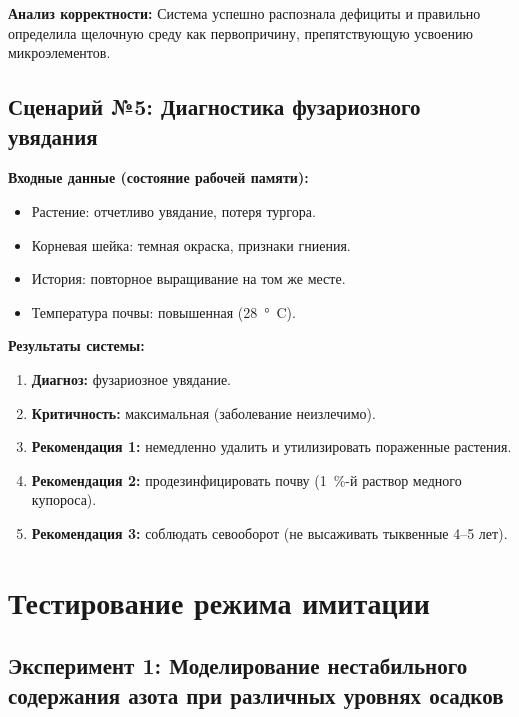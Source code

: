 \textbf{Анализ корректности:}
Система успешно распознала дефициты и правильно определила щелочную среду как первопричину, препятствующую усвоению микроэлементов.


\subsection{Сценарий №5: Диагностика фузариозного увядания}

\textbf{Входные данные (состояние рабочей памяти):}
\begin{itemize}
    \item Растение: отчетливо увядание, потеря тургора.
    \item Корневая шейка: темная окраска, признаки гниения.
    \item История: повторное выращивание на том же месте.
    \item Температура почвы: повышенная (\SI{28}{\degree C}).
\end{itemize}

\textbf{Результаты системы:}
\begin{enumerate}
    \item \textbf{Диагноз:} фузариозное увядание.
    \item \textbf{Критичность:} максимальная (заболевание неизлечимо).
    \item \textbf{Рекомендация 1:} немедленно удалить и утилизировать пораженные растения.
    \item \textbf{Рекомендация 2:} продезинфицировать почву (\SI{1}{\%}-й раствор медного купороса).
    \item \textbf{Рекомендация 3:} соблюдать севооборот (не высаживать тыквенные 4--5 лет).
\end{enumerate}


\section{Тестирование режима имитации}


\subsection{Эксперимент 1: Моделирование нестабильного содержания азота при различных уровнях осадков}



